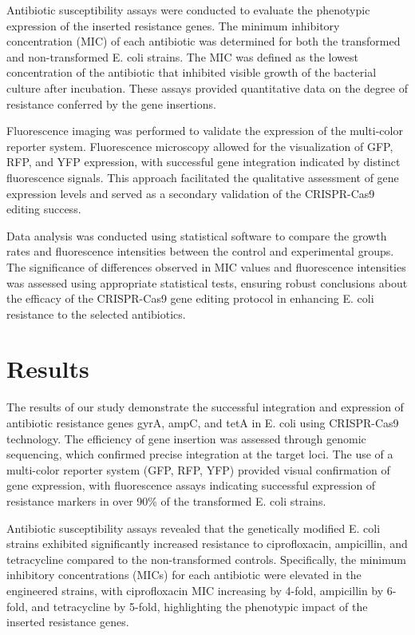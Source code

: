 \documentclass{article}
\begin{document}
Antibiotic susceptibility assays were conducted to evaluate the phenotypic expression of the inserted resistance genes. The minimum inhibitory concentration (MIC) of each antibiotic was determined for both the transformed and non-transformed E. coli strains. The MIC was defined as the lowest concentration of the antibiotic that inhibited visible growth of the bacterial culture after incubation. These assays provided quantitative data on the degree of resistance conferred by the gene insertions.

Fluorescence imaging was performed to validate the expression of the multi-color reporter system. Fluorescence microscopy allowed for the visualization of GFP, RFP, and YFP expression, with successful gene integration indicated by distinct fluorescence signals. This approach facilitated the qualitative assessment of gene expression levels and served as a secondary validation of the CRISPR-Cas9 editing success.

Data analysis was conducted using statistical software to compare the growth rates and fluorescence intensities between the control and experimental groups. The significance of differences observed in MIC values and fluorescence intensities was assessed using appropriate statistical tests, ensuring robust conclusions about the efficacy of the CRISPR-Cas9 gene editing protocol in enhancing E. coli resistance to the selected antibiotics.

\section{Results}
The results of our study demonstrate the successful integration and expression of antibiotic resistance genes gyrA, ampC, and tetA in E. coli using CRISPR-Cas9 technology. The efficiency of gene insertion was assessed through genomic sequencing, which confirmed precise integration at the target loci. The use of a multi-color reporter system (GFP, RFP, YFP) provided visual confirmation of gene expression, with fluorescence assays indicating successful expression of resistance markers in over 90\% of the transformed E. coli strains.

Antibiotic susceptibility assays revealed that the genetically modified E. coli strains exhibited significantly increased resistance to ciprofloxacin, ampicillin, and tetracycline compared to the non-transformed controls. Specifically, the minimum inhibitory concentrations (MICs) for each antibiotic were elevated in the engineered strains, with ciprofloxacin MIC increasing by 4-fold, ampicillin by 6-fold, and tetracycline by 5-fold, highlighting the phenotypic impact of the inserted resistance genes.
\end{document}
